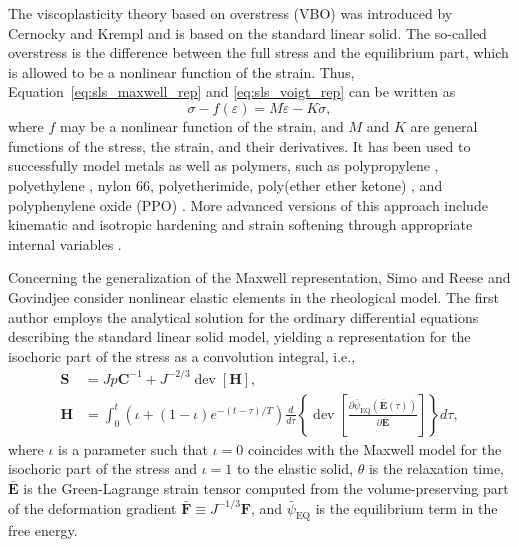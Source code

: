 The viscoplasticity theory based on overstress (VBO) was introduced by Cernocky and Krempl \citep{cernockyTheoryViscoplasticityBased1980} and is based on the standard linear solid.
The so-called overstress is the difference between the full stress and the equilibrium part, which is allowed to be a nonlinear function of the strain.
Thus, Equation~\eqref{eq:sls_maxwell_rep} and \eqref{eq:sls_voigt_rep} can be written as
\begin{equation}
	\sigma - f(\varepsilon) = M\dot\varepsilon - K\dot \sigma,
\end{equation}
where $f$ may be a nonlinear function of the strain, and $M$ and $K$ are general functions of the stress, the strain, and their derivatives.
It has been used to successfully model metals \citep{liuUniaxialViscoplasticModel1979, yaoViscoplasticityTheoryBased1985} as well as polymers, such as polypropylene \citep{kitagawaRatedependentNonlinearConstitutive1989}, polyethylene \citep{kitagawaNonlinearConstitutiveEquation1990}, nylon 66, polyetherimide, poly(ether ether ketone) \citep{krempl2000overstress}, and polyphenylene oxide (PPO) \citep{colakModelingDeformationBehavior2005}.
More advanced versions of this approach include kinematic and isotropic hardening and strain softening through appropriate internal variables \citep{krempl2000overstress, hoExtensionViscoplasticityTheory2002}.

Concerning the generalization of the Maxwell representation, Simo \citep{simoFullyThreedimensionalFinitestrain1987} and Reese and Govindjee \citep{reeseTheoryFiniteViscoelasticity1998} consider nonlinear elastic elements in the rheological model.
The first author employs the analytical solution for the ordinary differential equations describing the standard linear solid model, yielding a representation for the isochoric part of the stress as a convolution integral, i.e.,
\begin{align}
	\bm S &= Jp\bm C^{-1} + J^{-2/3}\operatorname{dev}[\bm H],\\
	\bm H &= \int_0^t (\iota + (1-\iota)e^{-(t-\tau)/T}) \frac{d}{d\tau}\left\{\operatorname{dev} \left[\frac{\partial {\bar\psi}_\text{EQ}(\bar{\bm E}(\tau))}{\partial \bar{\bm E}}\right]\right\}  d\tau,
\end{align}
where $\iota$ is a parameter such that $\iota=0$ coincides with the Maxwell model for the isochoric part of the stress and $\iota=1$ to the elastic solid, $\theta$ is the relaxation time, $\bar{\bm E}$ is the Green-Lagrange strain tensor computed from the volume-preserving part of the deformation gradient $\bar{\bm F} \equiv J^{-1/3} \bm F$, and $\bar{\psi	}_\text{EQ}$ is the equilibrium term in the free energy.

